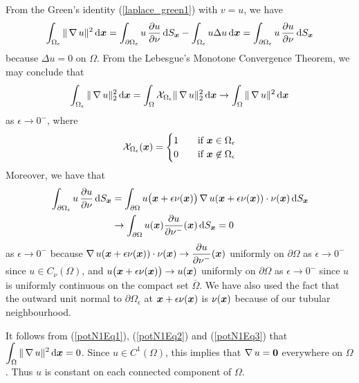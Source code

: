 From the Green's identity (\ref{laplace_green1}) with $v=u$, we have
\begin{equation} \label{potN1Eq1}
\int_{\Omega_\epsilon} \| \operatorname{\nabla} u \|^2 \,\mathrm{d}{{\bm{x}}} =
\int_{\partial \Omega_\epsilon} u\,\frac{\partial{u}}{\partial \nu} \,\mathrm{d}{S}_{{\bm{x}}}
- \int_{\Omega_\epsilon} u \Delta u \,\mathrm{d}{{\bm{x}}}  =
\int_{\partial \Omega_\epsilon} u\,\frac{\partial{u}}{\partial \nu} \,\mathrm{d}{S}_{{\bm{x}}}
\end{equation}
because $\Delta u = 0$ on $\Omega$.  From the Lebesgue's Monotone
Convergence Theorem, we may conclude that
\begin{equation} \label{potN1Eq2}
\int_{\Omega_\epsilon} \| \operatorname{\nabla} u \|_2^2 \,\mathrm{d}{{\bm{x}}}
= \int_\Omega \mathcal{X}_{\Omega_\epsilon} \| \operatorname{\nabla} u \|_2^2 \,\mathrm{d}{{\bm{x}}}
\rightarrow \int_\Omega \| \operatorname{\nabla} u \|^2 \,\mathrm{d}{{\bm{x}}}
\end{equation}
as $\epsilon \rightarrow 0^-$,  where
\[
\mathcal{X}_{\Omega_\epsilon}({\bm{x}}) =
\begin{cases}
1 & \quad \text{if} \ {\bm{x}} \in \Omega_\epsilon \\
0 & \quad \text{if} \ {\bm{x}} \not\in \Omega_\epsilon
\end{cases}
\]
Moreover, we have that
\begin{equation} \label{potN1Eq3}
\begin{split}
\int_{\partial \Omega_\epsilon} u\,\frac{\partial{u}}{\partial \nu} \,\mathrm{d}{S}_{{\bm{x}}}
&= \int_{\partial \Omega} u\big({\bm{x}} + \epsilon \nu({\bm{x}})\big)
\operatorname{\nabla} u({\bm{x}} + \epsilon \nu({\bm{x}})) \cdot \nu({\bm{x}}) 
\,\mathrm{d}{S}_{{\bm{x}}} \\
&\rightarrow \int_{\partial \Omega} u({\bm{x}}) \frac{\partial{u}}{\partial \nu^-}({\bm{x}})
\,\mathrm{d}{S}_{{\bm{x}}} = 0
\end{split}
\end{equation}
as $\epsilon \rightarrow 0^-$ because
$\displaystyle
\operatorname{\nabla} u({\bm{x}} + \epsilon \nu({\bm{x}})) \cdot \nu({\bm{x}})
\to \frac{\partial{u}}{\partial \nu^-}({\bm{x}})$ uniformly on $\partial \Omega$ as
$\epsilon \to 0^-$ since $u \in C_{\nu}(\Omega)$, and
$\displaystyle u\big({\bm{x}} + \epsilon \nu({\bm{x}})\big) \to
u({\bm{x}})$ uniformly on $\partial \Omega$ as $\epsilon \to 0^-$
since $u$ is uniformly continuous on the compact set $\overline{\Omega}$.
We have also used the fact that the outward unit normal to
$\partial \Omega_\epsilon$ at
${\bm{x}} + \epsilon \nu({\bm{x}})$ is $\nu({\bm{x}})$
because of our tubular neighbourhood.

It follows from (\ref{potN1Eq1}), (\ref{potN1Eq2}) and (\ref{potN1Eq3})
that $\displaystyle \int_\Omega \| \operatorname{\nabla} u \|^2 \,\mathrm{d}{{\bm{x}}} = 0$.
Since $\displaystyle u \in C^1(\Omega)$, this implies that $\operatorname{\nabla} u = {\bm{0}}$
everywhere on $\Omega$.  Thus $u$ is constant on each connected
component of $\Omega$.

